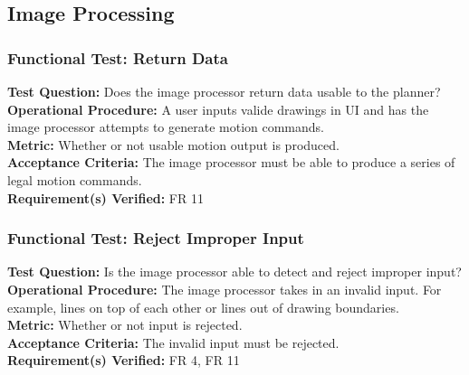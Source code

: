
\subsection{Image Processing}
\label{sec:verification_image}

\subsubsection{Functional Test: Return Data}
\label{test:image_ft_data}
\textbf{Test Question:} Does the image processor return data usable to the planner?\\
\textbf{Operational Procedure:} A user inputs valide drawings in UI and has the image processor attempts to generate motion commands.\\
\textbf{Metric:} Whether or not usable motion output is produced.\\
\textbf{Acceptance Criteria:} The image processor must be able to produce a series of legal motion commands.\\
\textbf{Requirement(s) Verified:} FR 11

\subsubsection{Functional Test: Reject Improper Input}
\label{test:image_ft_reject}
\textbf{Test Question:} Is the image processor able to detect and reject improper input?\\
\textbf{Operational Procedure:} The image processor takes in an invalid input. For example, lines on top of each other or lines out of drawing boundaries. \\
\textbf{Metric:} Whether or not input is rejected.\\
\textbf{Acceptance Criteria:} The invalid input must be rejected.\\
\textbf{Requirement(s) Verified:} FR 4, FR 11
